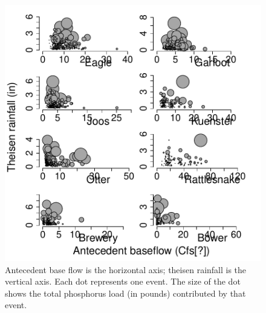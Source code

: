 \documentclass[10pt]{article}
\begin{document}
\begin{figure}
    \begin{center}
\includegraphics{loadings-figure5}
    \end{center}
    \caption{Antecedent base flow is the horizontal axis; theisen rainfall is the vertical axis. Each dot represents one event. The size of the dot shows the total phosphorus load (in pounds) contributed by that event. \label{phos_bubbles}}
\end{figure}





\end{document}
